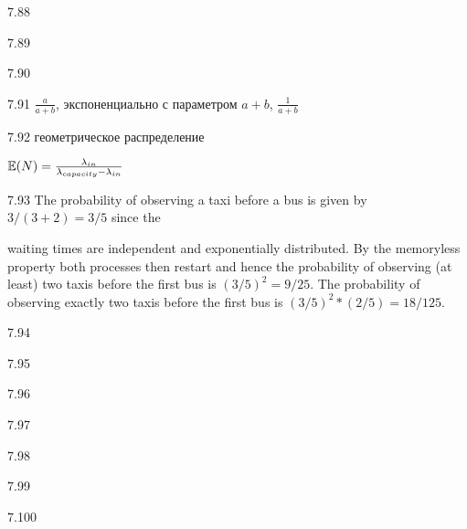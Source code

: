 \protect \hypertarget {soln:7.88}{}
\begin{solution}{{7.88}}
\end{solution}
\protect \hypertarget {soln:7.89}{}
\begin{solution}{{7.89}}
\end{solution}
\protect \hypertarget {soln:7.90}{}
\begin{solution}{{7.90}}
\end{solution}
\protect \hypertarget {soln:7.91}{}
\begin{solution}{{7.91}}
$\frac{a}{a+b}$, экспоненциально с параметром $a+b$, $\frac{1}{a+b}$
\end{solution}
\protect \hypertarget {soln:7.92}{}
\begin{solution}{{7.92}}
  геометрическое распределение

  $\mathbb{E}(N)=\frac{\lambda_{in}}{\lambda_{capacity}-\lambda_{in}}$
\end{solution}
\protect \hypertarget {soln:7.93}{}
\begin{solution}{{7.93}}
  The probability of observing a taxi before a bus is given by $3/(3+2)=3/5$ since the

  waiting times are independent and exponentially distributed. By the memoryless
  property both processes then restart and hence the probability of observing (at least)
  two taxis before the first bus is $(3/5)^2=9/25$. The probability of observing exactly
  two taxis before the first bus is $(3/5)^2*(2/5)=18/125$.
\end{solution}
\protect \hypertarget {soln:7.94}{}
\begin{solution}{{7.94}}
\end{solution}
\protect \hypertarget {soln:7.95}{}
\begin{solution}{{7.95}}
\end{solution}
\protect \hypertarget {soln:7.96}{}
\begin{solution}{{7.96}}
\end{solution}
\protect \hypertarget {soln:7.97}{}
\begin{solution}{{7.97}}
\end{solution}
\protect \hypertarget {soln:7.98}{}
\begin{solution}{{7.98}}
\end{solution}
\protect \hypertarget {soln:7.99}{}
\begin{solution}{{7.99}}
\end{solution}
\protect \hypertarget {soln:7.100}{}
\begin{solution}{{7.100}}
\end{solution}
